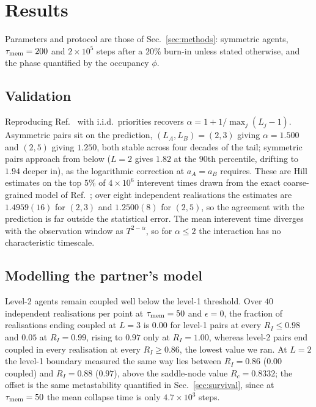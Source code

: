 \documentclass[aps,pre,twocolumn,superscriptaddress,floatfix,longbibliography]{revtex4-2}
\begin{document}
\section{Results}
\label{sec:results}

Parameters and protocol are those of Sec.~\ref{sec:methods}: symmetric
agents, $\tau_{\rm mem}=200$ and $2\times10^5$ steps after a $20\%$ burn-in
unless stated otherwise, and the phase quantified by the occupancy $\phi$.

\subsection{Validation}

Reproducing Ref.~\cite{oliveira2009} with i.i.d.\ priorities recovers
$\alpha=1+1/\max_j(L_j-1)$. Asymmetric pairs sit on the prediction,
$(L_A,L_B)=(2,3)$ giving $\alpha=1.500$ and $(2,5)$ giving $1.250$, both stable
across four decades of the tail; symmetric pairs approach from below ($L=2$
gives $1.82$ at the $90$th percentile, drifting to $1.94$ deeper in), as the
logarithmic correction at $a_A=a_B$ requires. These are Hill estimates on
the top $5\%$ of $4\times10^{6}$ interevent times drawn from the exact
coarse-grained model of Ref.~\cite{oliveira2009}; over eight independent
realisations the estimates are $1.4959(16)$ for $(2,3)$ and
$1.2500(8)$ for $(2,5)$, so the agreement with the prediction is far
outside the statistical error. The mean interevent time diverges
with the observation window as $T^{2-\alpha}$, so for $\alpha\le2$ the
interaction has no characteristic timescale.

\subsection{Modelling the partner's model}
\label{sec:levels}

Level-2 agents remain coupled well below the level-1 threshold. Over $40$
independent realisations per point at $\tau_{\rm mem}=50$ and $\epsilon=0$, the
fraction of realisations ending coupled at $L=3$ is $0.00$ for level-1 pairs at
every $R_I\le0.98$ and $0.05$ at $R_I=0.99$, rising to $0.97$ only at
$R_I=1.00$, whereas level-2 pairs end coupled in every realisation at every
$R_I\ge0.86$, the lowest value we ran. At $L=2$ the level-1 boundary measured
the same way lies between $R_I=0.86$ ($0.00$ coupled) and $R_I=0.88$ ($0.97$),
above the saddle-node value $R_c=0.8332$; the offset is the same metastability
quantified in Sec.~\ref{sec:survival}, since at $\tau_{\rm mem}=50$ the mean
collapse time is only $4.7\times10^{3}$ steps.
\end{document}
